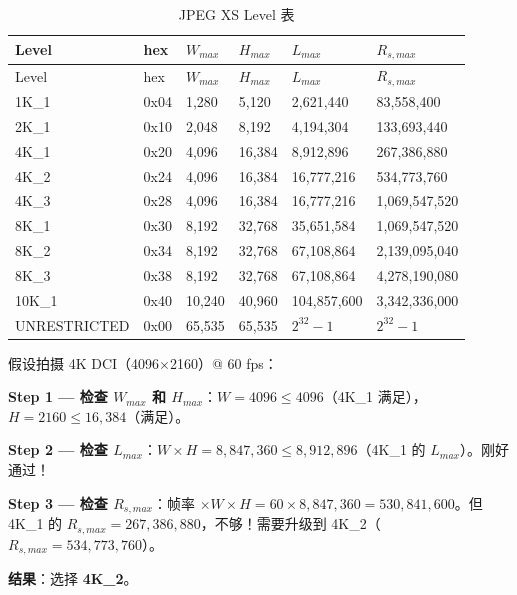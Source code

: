 \footnotesize
\setlength{\tabcolsep}{3.5pt}
\begin{longtable}{@{}L{2.2cm}L{0.9cm}R{1.5cm}R{1.5cm}R{2.2cm}R{2.4cm}@{}}
\caption{JPEG XS Level 表}
\label{tab:level-table}\\
\toprule
Level & hex & $W_{max}$ & $H_{max}$ & $L_{max}$ & $R_{s,max}$ \\
\midrule
\endfirsthead
\toprule
Level & hex & $W_{max}$ & $H_{max}$ & $L_{max}$ & $R_{s,max}$ \\
\midrule
\endhead
1K\_1 & 0x04 & 1{,}280 & 5{,}120 & 2{,}621{,}440 & 83{,}558{,}400 \\
2K\_1 & 0x10 & 2{,}048 & 8{,}192 & 4{,}194{,}304 & 133{,}693{,}440 \\
4K\_1 & 0x20 & 4{,}096 & 16{,}384 & 8{,}912{,}896 & 267{,}386{,}880 \\
4K\_2 & 0x24 & 4{,}096 & 16{,}384 & 16{,}777{,}216 & 534{,}773{,}760 \\
4K\_3 & 0x28 & 4{,}096 & 16{,}384 & 16{,}777{,}216 & 1{,}069{,}547{,}520 \\
8K\_1 & 0x30 & 8{,}192 & 32{,}768 & 35{,}651{,}584 & 1{,}069{,}547{,}520 \\
8K\_2 & 0x34 & 8{,}192 & 32{,}768 & 67{,}108{,}864 & 2{,}139{,}095{,}040 \\
8K\_3 & 0x38 & 8{,}192 & 32{,}768 & 67{,}108{,}864 & 4{,}278{,}190{,}080 \\
10K\_1 & 0x40 & 10{,}240 & 40{,}960 & 104{,}857{,}600 & 3{,}342{,}336{,}000 \\
UNRESTRICTED & 0x00 & 65{,}535 & 65{,}535 & $2^{32}{-}1$ & $2^{32}{-}1$ \\
\bottomrule
\end{longtable}

\begin{examplebox}[title={Level 选型示例}]
假设拍摄 4K DCI（4096$\times$2160）@ 60 fps：

\medskip
\textbf{Step 1 — 检查 $W_{max}$ 和 $H_{max}$}：$W = 4096 \leq 4096$（4K\_1 满足），$H = 2160 \leq 16{,}384$（满足）。

\textbf{Step 2 — 检查 $L_{max}$}：$W \times H = 8{,}847{,}360 \leq 8{,}912{,}896$（4K\_1 的 $L_{max}$）。刚好通过！

\textbf{Step 3 — 检查 $R_{s,max}$}：帧率 $\times W \times H = 60 \times 8{,}847{,}360 = 530{,}841{,}600$。但 4K\_1 的 $R_{s,max} = 267{,}386{,}880$，不够！需要升级到 4K\_2（$R_{s,max} = 534{,}773{,}760$）。

\textbf{结果}：选择 \textbf{4K\_2}。
\end{examplebox}

